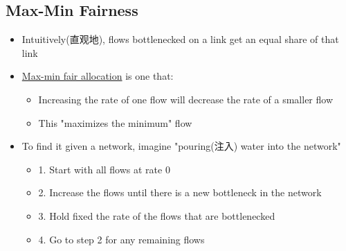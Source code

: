 \documentclass[12pt]{ctexart}   %
\begin{document}
	\subsection{Max-Min Fairness}
	\begin{itemize}
		\item Intuitively(直观地), flows bottlenecked on a link get an equal share of that link
		\item \underline{Max-min fair allocation} is one that:
		\begin{itemize}
			\item Increasing the rate of one flow will decrease the rate of a smaller flow
			\item This "maximizes the minimum" flow
		\end{itemize}
		
		\item To find it given a network, imagine "pouring(注入) water into the network"
		\begin{itemize}
			\item {\color{blue} 1.} Start with all flows at rate 0
			\item {\color{blue} 2.} Increase the flows until there is a new bottleneck in the network
			\item {\color{blue} 3.} Hold fixed the rate of the flows that are bottlenecked
			\item {\color{blue} 4.} Go to step 2 for any remaining flows
		\end{itemize}
	\end{itemize}
	
\end{document}
